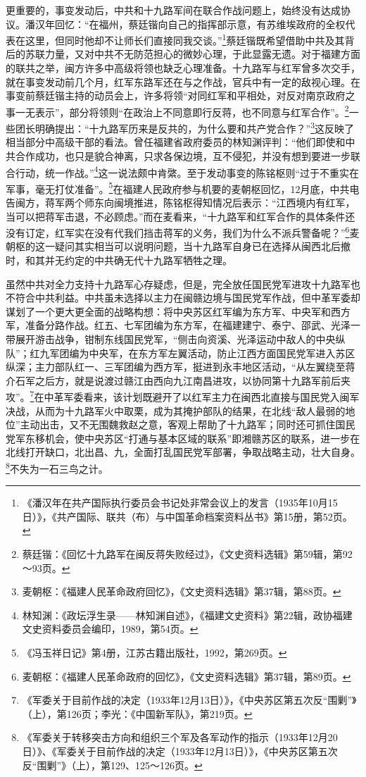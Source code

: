 更重要的，事变发动后，中共和十九路军间在联合作战问题上，始终没有达成协议。潘汉年回忆：“在福州，蔡廷锴向自己的指挥部示意，有苏维埃政府的全权代表在这里，但同时他却不让师长们直接同我交谈。”\footnote{《潘汉年在共产国际执行委员会书记处非常会议上的发言（1935年10月15日）》，《共产国际、联共（布）与中国革命档案资料丛书》第15册，第52页。}蔡廷锴既希望借助中共及其背后的苏联力量，又对中共不无防范担心的微妙心理，于此显露无遗。对于福建方面的联共之举，闽方许多中高级将领也缺乏心理准备。十九路军与红军曾多次交手，就在事变发动前几个月，红军东路军还在与之作战，官兵中有一定的敌视心理。在事变前蔡廷锴主持的动员会上，许多将领“对同红军和平相处，对反对南京政府之事一无表示”，部分将领则“在政治上不同意即行反蒋，也不同意与红军合作”。\footnote{蔡廷锴：《回忆十九路军在闽反蒋失败经过》，《文史资料选辑》第59辑，第92～93页。}一些团长明确提出：“十九路军历来是反共的，为什么要和共产党合作？”\footnote{麦朝枢：《福建人民革命政府回忆》，《文史资料选辑》第37辑，第88页。}这反映了相当部分中高级干部的看法。曾任福建省政府委员的林知渊评判：“他们即使和中共合作成功，也只是貌合神离，只求各保边境，互不侵犯，并没有想到要进一步联合行动，统一作战。”\footnote{林知渊：《政坛浮生录——林知渊自述》，《福建文史资料》第22辑，政协福建文史资料委员会编印，1989，第54页。}这一说法颇中肯綮。至于发动事变的陈铭枢则“过于不重实在军事，毫无打仗准备”。\footnote{《冯玉祥日记》第4册，江苏古籍出版社，1992，第269页。}在福建人民政府参与机要的麦朝枢回忆，12月底，中共电告闽方，蒋军两个师东向闽境推进，陈铭枢得知情况后表示：“江西境内有红军，当可以把蒋军击退，不必顾虑。”而在麦看来，“十九路军和红军合作的具体条件还没有订定，红军实在没有代我们挡击蒋军的义务，我们为什么不派兵警备呢？”\footnote{麦朝枢：《福建人民革命政府的回忆》，《文史资料选辑》第37辑，第89页。}麦朝枢的这一疑问其实相当可以说明问题，当十九路军自身已在选择从闽西北后撤时，和其并无约定的中共确无代十九路军牺牲之理。


虽然中共对全力支持十九路军心存疑虑，但是，完全放任国民党军进攻十九路军也不符合中共利益。中共虽未选择以主力在闽赣边境与国民党军作战，但中革军委却谋划了一个更大更全面的战略构想：将中央苏区红军编为东方军、中央军和西方军，准备分路作战。红五、七军团编为东方军，在福建建宁、泰宁、邵武、光泽一带展开游击战争，钳制东线国民党军，“侧击向资溪、光泽运动中敌人的中央纵队”；红九军团编为中央军，在东方军左翼活动，防止江西方面国民党军进入苏区纵深；主力部队红一、三军团编为西方军，挺进到永丰地区活动，“从左翼绕至蒋介石军之后方，就是说渡过赣江由西向九江南昌进攻，以协同第十九路军前后夹攻”。\footnote{《军委关于目前作战的决定（1933年12月13日）》，《中央苏区第五次反“围剿”》（上），第126页；李光：《中国新军队》，第219页。}在中革军委看来，该计划既避开了以红军主力在闽西北直接与国民党入闽军决战，从而为十九路军火中取栗，成为其掩护部队的结果，在北线“敌人最弱的地位”主动出击，又不无围魏救赵之意，客观上帮助了十九路军；同时还可抓住国民党军东移机会，使中央苏区“打通与基本区域的联系”即湘赣苏区的联系，进一步在北线打开缺口，北出昌、九，全面打乱国民党军部署，争取战略主动，壮大自身。\footnote{《军委关于转移突击方向和组织三个军及各军动作的指示（1933年12月20日）》、《军委关于目前作战的决定（1933年12月13日）》，《中央苏区第五次反“围剿”》（上），第129、125～126页。}不失为一石三鸟之计。


